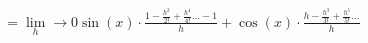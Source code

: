\documentclass[preview]{standalone}
\begin{document}
\begin{align*}
= \lim_ h \to 0  \sin(x) \cdot \frac{1 - \frac{h^2}{2!} + \frac{h^4}{4!} \dots - 1}{h} + \cos(x) \cdot \frac{h - \frac{h^3}{3!} + \frac{h^5}{5!} \dots}{h}
\end{align*}
\end{document}
